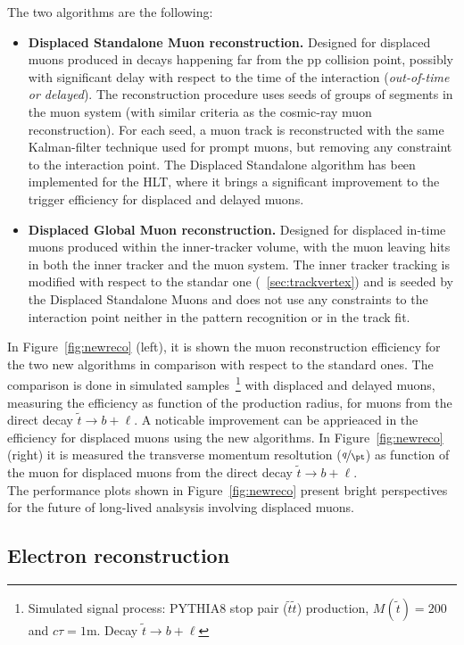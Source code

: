 The two algorithms are the following:
\begin{itemize}
\setlength\itemsep{-0.2em}
\item \textbf{Displaced Standalone Muon reconstruction.} Designed for
  displaced muons produced in decays happening far from the pp
  collision point, possibly with significant delay with respect to the time of the
  interaction (\emph{out-of-time or delayed}). The reconstruction
  procedure uses seeds of groups of segments in the muon system
  (with similar criteria as the cosmic-ray muon reconstruction). For
  each seed, a muon track is reconstructed with the same Kalman-filter
  technique used for prompt muons, but removing any constraint to the
  interaction point. The Displaced Standalone algorithm has been implemented for the HLT,
  where it brings a significant improvement to the trigger efficiency for displaced and delayed
  muons.
\item \textbf{Displaced Global Muon reconstruction.} Designed for displaced in-time muons produced within the inner-tracker volume, with the
  muon leaving hits in both the inner tracker and the muon system. The
  inner tracker tracking is modified with respect to the standar one
  (~\ref{sec:trackvertex}) and is seeded by the Displaced Standalone Muons and does
  not use any constraints to the interaction point neither in the pattern recognition or in the track fit.
\end{itemize}
In Figure~\ref{fig:newreco} (left), it is shown the muon reconstruction
efficiency for the two new algorithms in comparison with respect to
the standard ones. The comparison is done in 
simulated samples~\footnote{Simulated signal process: PYTHIA8 stop 
  pair ($\tilde{t}\tilde{t}$) production, $M(\tilde{t}) = 200$\GeV and
$c\tau=1$m. Decay $\tilde{t} \rightarrow b + \ell$} with displaced and
delayed muons, measuring the efficiency as function of the production radius, for muons from
the direct decay $\tilde{t} \rightarrow b + \ell$. A noticable
improvement can be apprieaced in the efficiency for displaced muons
using the new algorithms. In Figure~\ref{fig:newreco} (right) it is
measured the transverse momentum resoltution ($\nicefrac{q}{\pt}$) as
function of the muon \pt for displaced muons from the direct decay $\tilde{t} \rightarrow b + \ell$.\\
The performance plots shown in Figure~\ref{fig:newreco} present bright
perspectives for the future of long-lived analsysis involving
displaced muons. 

\subsection{Electron reconstruction}\label{sec:c2ele}

